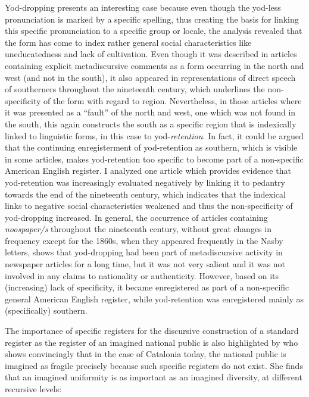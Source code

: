 Yod-dropping presents an interesting case because even though the yod-less pronunciation is marked by a specific spelling, thus creating the basis for linking this specific pronunciation to a specific group or locale, the analysis revealed that the form has come to index rather general social characteristics like uneducatedness and lack of cultivation. Even though it was described in articles containing explicit metadiscursive comments as a form occurring in the north and west (and not in the south), it also appeared in representations of direct speech of southerners throughout the nineteenth century, which underlines the non-specificity of the form with regard to region. Nevertheless, in those articles where it was presented as a “fault” of the north and west, one which was not found in the south, this again constructs the south as a specific region that is indexically linked to linguistic forms, in this case to yod-\emph{retention}. In fact, it could be argued that the continuing enregisterment of yod-retention as southern, which is visible in some articles, makes yod-retention too specific to become part of a non-specific American English register. I analyzed one article which provides evidence that yod-retention was increasingly evaluated negatively by linking it to pedantry towards the end of the nineteenth century, which indicates that the indexical links to negative social characteristics weakened and thus the non-specificity of yod-dropping increased. In general, the occurrence of articles containing \emph{noospaper/s} throughout the nineteenth century, without great changes in frequency except for the 1860s, when they appeared frequently in the Nasby letters, shows that yod-dropping had been part of metadiscursive activity in newspaper articles for a long time, but it was not very salient and it was not involved in any claims to nationality or authenticity. However, based on its (increasing) lack of specificity, it became enregistered as part of a non-specific general American English register, while yod-retention was enregistered mainly as (specifically) southern.

The importance of specific registers for the discursive construction of a standard register as the register of an imagined national public is also highlighted by \citet{Frekko2009} who shows convincingly that in the case of Catalonia today, the national public is imagined as fragile precisely because such specific registers do not exist. She finds that an imagined uniformity is as important as an imagined diversity, at different recursive levels:

